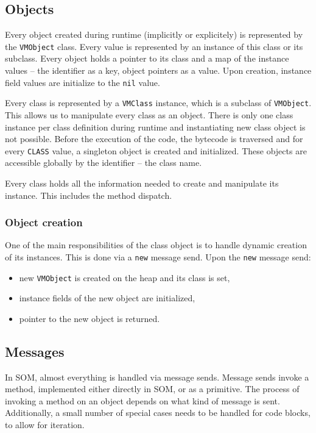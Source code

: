 \documentclass[thesis=M,english]{FITthesis}[2019/12/23]
\begin{document}
\subsection{Objects}
Every object created during runtime (implicitly or explicitely) is represented by the \texttt{VMObject} class. Every value is represented by an instance of this
class or its subclass. Every object holds a pointer to its class and a map of the instance values -- the identifier as a key, object pointers as a value. Upon creation,
instance field values are initialize to the \texttt{nil} value.

Every class is represented by a \texttt{VMClass} instance, which is a subclass of \texttt{VMObject}. This allows us to manipulate every class as an object. There
is only one class instance per class definition during runtime and instantiating new class object is not possible. Before the execution of the code, the bytecode
is traversed and for every \texttt{CLASS} value, a singleton object is created and initialized. These objects are accessible globally by the identifier -- the class name.

Every class holds all the information needed to create and manipulate its instance. This includes the method dispatch.

\subsubsection{Object creation}
One of the main responsibilities of the class object is to handle dynamic creation of its instances. This is done via a \texttt{new} message send.
Upon the \texttt{new} message send:
\begin{itemize}
	\item new \texttt{VMObject} is created on the heap and its class is set,
	\item instance fields of the new object are initialized,
	\item pointer to the new object is returned.
\end{itemize}

\subsection{Messages}
In SOM, almost everything is handled via message sends. Message sends invoke a method, implemented either directly in SOM, or as a primitive.
The process of invoking a method on an object depends on what kind of message is sent. Additionally, a small number of special cases needs to
be handled for code blocks, to allow for iteration.
\end{document}
